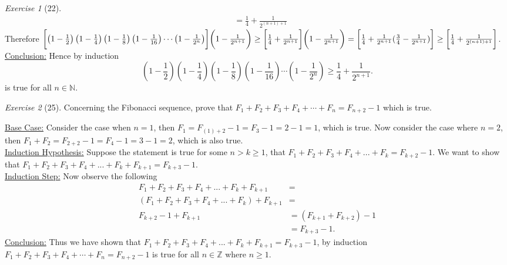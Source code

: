 \documentclass[12pt]{amsart}
\makeatletter
\theoremstyle{remark}
\newtheorem*{exercise}{Exercise}%
\def\NN{\ensuremath{\mathbb N}}
\def\ZZ{\ensuremath{\mathbb Z}}
\renewenvironment{proof}[1][\proofname]{\par\doublespacing
  \pushQED{\qed}%
  \normalfont \topsep6\p@\@plus6\p@\relax
  \list{}{%
    \settowidth{\leftmargin}{\itshape\proofname:\hskip\labelsep}%
    \setlength{\labelwidth}{0pt}%
    \setlength{\itemindent}{-\leftmargin}%
  }%
  \item[\hskip\labelsep\itshape#1\@addpunct{:}]\ignorespaces
}{%
  \popQED\endlist\@endpefalse
  \singlespacing
}
\theoremstyle{mycomment}
\makeatother
\begin{document}
\begin{exercise}[22]
\begin{proof}
\begin{align*}
                                                                   &= \frac{1}{4} + \frac{1}{2^{(n+1)+1}}
  \end{align*}
  Therefore $\biggl[\left(1-\frac{1}{2}\right)\left(1-\frac{1}{4}\right)\left(1-\frac{1}{8}\right)\left(1-\frac{1}{16}\right)\cdots\left(1-\frac{1}{2^{n}}\right) \biggr] \biggl(1 - \frac{1}{2^{n+1}} \biggr) \\ \ge \biggl[\frac{1}{4}+\frac{1}{2^{n+1}}\biggr] \biggl(1 - \frac{1}{2^{n+1}} \biggr) = \biggl[\frac{1}{4} + \frac{1}{2^{n+1}}(\frac{3}{4} - \frac{1}{2^{n+1}})\biggr]
  \geq \biggl[\frac{1}{4} + \frac{1}{2^{(n+1)+1}}\biggr]$.\\ 
\underline{Conclusion:} Hence by induction  $$\left(1-\frac{1}{2}\right)\left(1-\frac{1}{4}\right)\left(1-\frac{1}{8}\right)\left(1-\frac{1}{16}\right)\cdots\left(1-\frac{1}{2^{n}}\right)\ge \frac{1}{4}+\frac{1}{2^{n+1}}.$$ is true for all $n \in \NN$.
\end{proof}
\end{exercise}
\break
\begin{exercise}[25] Concerning the Fibonacci sequence, prove that $F_{1}+F_{2}+F_{3}+F_{4}+\cdots+F_{n}=F_{n+2}-1$ which is true.
\begin{proof}
  \underline{Base Case:} Consider the case when $n = 1$, then $F_1 = F_{(1)+2} - 1 = F_3 - 1 = 2 - 1 = 1$, which is true. Now consider the case where $n = 2$, then $F_1 + F_2 = F_{2+2} - 1 = F_{4} - 1 = 3 - 1 = 2$, which is also true. \\
  \underline{Induction Hypothesis:} Suppose the statement is true for some $n > k \geq 1$, that $F_1 + F_2 + F_3 + F_4 + ... + F_k = F_{k+2} -1$. We want to show that $F_1 + F_2 + F_3 + F_4 + ... + F_k + F_{k+1} = F_{k+3} - 1$. \\
  \underline{Induction Step:} Now observe the following
  \begin{align*}
    F_1 + F_2 + F_3 + F_4 + ... + F_k + F_{k+1} &= \\
    (F_1 + F_2 + F_3 + F_4 + ... + F_k) + F_{k+1} &= \\
    F_{k+2} - 1 + F_{k+1} &= (F_{k+1} + F_{k+2}) - 1 \\
                          &= F_{k+3} - 1.
  \end{align*}
\underline{Conclusion:} Thus we have shown that $F_1 + F_2 + F_3 + F_4 + ... + F_k + F_{k+1} = F_{k+3} - 1$, by induction $F_{1}+F_{2}+F_{3}+F_{4}+\cdots+F_{n}=F_{n+2}-1$ is true for all $n \in \ZZ$ where $n \geq 1$.
\end{proof}
\end{exercise}
\end{document}
